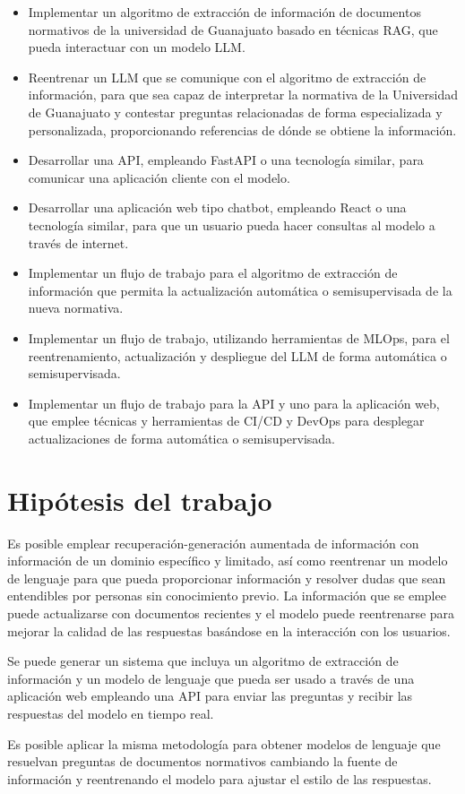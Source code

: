 \begin{itemize}
      \item Implementar un algoritmo de extracción de información de documentos
            normativos de la universidad de Guanajuato basado en técnicas RAG, que
            pueda interactuar con un modelo LLM.
      \item Reentrenar un LLM que se comunique con el algoritmo de extracción de
            información, para que sea capaz de interpretar la normativa de la Universidad
            de Guanajuato y contestar preguntas relacionadas de forma especializada y
            personalizada, proporcionando referencias de dónde se obtiene la información.
      \item Desarrollar una API, empleando FastAPI o una tecnología similar,
            para comunicar una aplicación cliente con el modelo.
      \item Desarrollar una aplicación web tipo chatbot, empleando React o una
            tecnología similar, para que un usuario pueda hacer consultas al modelo a
            través de internet.
      \item Implementar un flujo de trabajo para el algoritmo de extracción de
            información que permita la actualización automática o semisupervisada de
            la nueva normativa.
      \item Implementar un flujo de trabajo, utilizando herramientas de MLOps,
            para el reentrenamiento, actualización y despliegue del LLM de forma automática
            o semisupervisada.
      \item Implementar un flujo de trabajo para la API y uno para la aplicación
            web, que emplee técnicas y herramientas de CI/CD y DevOps para desplegar
            actualizaciones de forma automática o semisupervisada.
\end{itemize}

\section{Hipótesis del trabajo}

Es posible emplear recuperación-generación aumentada de información con información
de un dominio específico y limitado, así como reentrenar un modelo de lenguaje
para que pueda proporcionar información y resolver dudas que sean entendibles
por personas sin conocimiento previo. La información que se emplee puede
actualizarse con documentos recientes y el modelo puede reentrenarse para mejorar
la calidad de las respuestas basándose en la interacción con los usuarios.

Se puede generar un sistema que incluya un algoritmo de extracción de información
y un modelo de lenguaje que pueda ser usado a través de una aplicación web
empleando una API para enviar las preguntas y recibir las respuestas del modelo
en tiempo real.

Es posible aplicar la misma metodología para obtener modelos de lenguaje que
resuelvan preguntas de documentos normativos cambiando la fuente de información
y reentrenando el modelo para ajustar el estilo de las respuestas.
